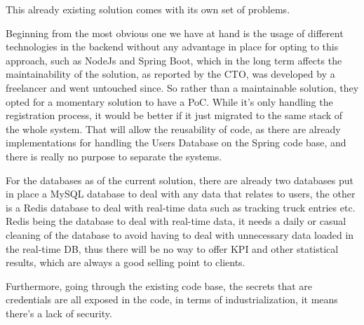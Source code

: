 This already existing solution comes with its own set of problems.

Beginning from the most obvious one we have at hand is the usage of different technologies in
the backend without any advantage in place for opting to this approach, such as NodeJs and Spring
Boot, which in the long term affects the maintainability of the solution, as reported by the CTO,
was developed by a freelancer and went untouched since. So rather than a maintainable solution,
they opted for a momentary solution to have a PoC.
While it's only handling the registration process, it would be better if it just migrated to the
same stack of the whole system. That will allow the reusability of code, as there are already
implementations for handling the Users Database on the Spring code base, and there is really
no purpose to separate the systems.

For the databases as of the current solution,
there are already two databases put in place a MySQL database to deal with any data that relates to users,
the other is a Redis database to deal with real-time data such as tracking truck entries etc.
Redis being the database to deal with real-time data, it needs a daily or
casual cleaning of the database to avoid having to deal with unnecessary data loaded in the real-time DB,
thus there will be no way to offer KPI and other statistical results, which are always a good selling point
to clients.

Furthermore, going through the existing code base, the secrets that are credentials are all exposed in the code,
in terms of industrialization, it means there's a lack of security.

